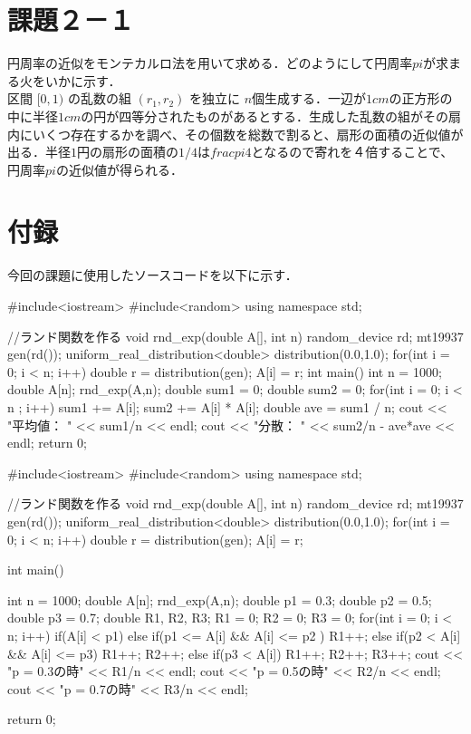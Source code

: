 \documentclass[fleqn, a4paper. 12pt]{ltjsarticle} %
\begin{document}
\section{課題２－１}
円周率の近似をモンテカルロ法を用いて求める．どのようにして円周率$pi$が求まる火をいかに示す．\\
区間 $[0,1)$ の乱数の組 $(r_1,r_2)$ を独立に $n$個生成する．一辺が$1cm$の正方形の中に半径$1cm$の円が四等分されたものがあるとする．生成した乱数の組がその扇内にいくつ存在するかを調べ、その個数を総数で割ると、扇形の面積の近似値が出る．半径$1$円の扇形の面積の$1/4$は$frac{pi}{4}$となるので寄れを４倍することで、円周率$pi$の近似値が得られる．

\newpage
\section*{付録}
今回の課題に使用したソースコードを以下に示す．
\begin{cppcode}
  #include<iostream>
#include<random>
using namespace std;

//ランド関数を作る
void rnd_exp(double A[], int n){
    random_device rd;
    mt19937 gen(rd());
    uniform_real_distribution<double> distribution(0.0,1.0);
    for(int i = 0; i < n; i++){
        double r = distribution(gen);
        A[i] = r;
    }
}
int main(){
    int n = 1000;
    double A[n];
    rnd_exp(A,n);
    double sum1 = 0;
    double sum2 = 0;
    for(int i = 0; i < n ; i++){
        sum1 += A[i];
        sum2 += A[i] * A[i];
    }
    double ave = sum1 / n;
    cout << "平均値： " << sum1/n << endl;
    cout << "分散： " << sum2/n - ave*ave << endl;
    return 0;
}
\end{cppcode}
\begin{cppcode}
  #include<iostream>
#include<random>
using namespace std;

//ランド関数を作る
void rnd_exp(double A[], int n){
    random_device rd;
    mt19937 gen(rd());
    uniform_real_distribution<double> distribution(0.0,1.0);
    for(int i = 0; i < n; i++){
        double r = distribution(gen);
        A[i] = r;
    }
}

int main(){
    int n = 1000;
    double A[n];
    rnd_exp(A,n);
    double p1 = 0.3;
    double p2 = 0.5;
    double p3 = 0.7;
    double R1, R2, R3;
    R1 = 0;
    R2 = 0;
    R3 = 0;
    for(int i = 0; i < n; i++){
        if(A[i] < p1){
        }
        else if(p1 <= A[i] && A[i] <= p2 ){
            R1++;
        }
        else if(p2 < A[i] && A[i] <= p3){
            R1++;
            R2++;
        }
        else if(p3 < A[i]){
            R1++;
            R2++;
            R3++;
        }
    }
    cout << "p = 0.3の時" << R1/n << endl;
    cout << "p = 0.5の時" << R2/n << endl;
    cout << "p = 0.7の時" << R3/n << endl;

    return 0;
}
\end{cppcode}
\end{document}
